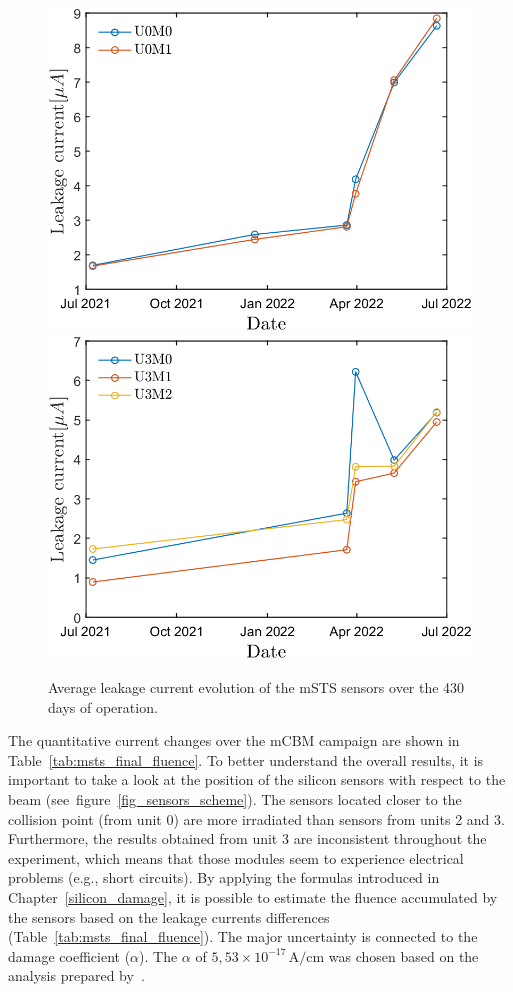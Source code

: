 \begin{figure}[!h]
\centering
\includegraphics[width=0.48\columnwidth]{Chapter6/DCS/images/sensors/U0_leakage.png}
\includegraphics[width=0.48\columnwidth]{Chapter6/DCS/images/sensors/U3_leakage.png}
\caption{Average leakage current evolution of the \gls{mSTS} sensors over the 430 days of operation. }
\label{fig_leak}
\end{figure}

\newpage
The quantitative current changes over the \gls{mCBM} campaign are shown in Table~\ref{tab:msts_final_fluence}. To better understand the overall results, it is important to take a look at the position of the silicon sensors with respect to the beam (see~figure~\ref{fig_sensors_scheme}). The sensors located closer to the collision point (from unit 0) are more irradiated than sensors from units 2 and 3. Furthermore, the results obtained from unit 3 are inconsistent throughout the experiment, which means that those modules seem to experience electrical problems (e.g., short circuits). By applying the formulas introduced in Chapter~\ref{silicon_damage}, it is possible to estimate the fluence accumulated by the sensors based on the leakage currents differences (Table~\ref{tab:msts_final_fluence}).
The major uncertainty is connected to the damage coefficient ($\alpha$). The $\alpha$ of $5,53\times 10^{-17}\,\mathrm{A/cm}$ was chosen based on the analysis prepared by~\cite{Larionov:2016eoz}. 

